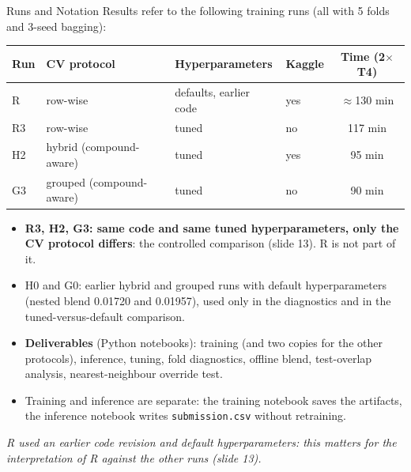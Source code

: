 \documentclass[aspectratio=169,10pt]{beamer}
\newcommand{\smallnote}[1]{{\tiny\textit{#1}}}
\begin{document}
\begin{frame}{Runs and Notation}
\small
Results refer to the following training runs (all with 5 folds and 3-seed bagging):
\vspace{0.3em}

\begin{tabular}{llllc}
\toprule
\textbf{Run} & \textbf{CV protocol} & \textbf{Hyperparameters} & \textbf{Kaggle} & \textbf{Time (2$\times$T4)}\\
\midrule
R  & row-wise & defaults, earlier code & yes & $\approx$130 min\\
R3 & row-wise & tuned & no & 117 min\\
H2 & hybrid (compound-aware) & tuned & yes & 95 min\\
G3 & grouped (compound-aware) & tuned & no & 90 min\\
\bottomrule
\end{tabular}
\vspace{0.5em}
\begin{itemize}
  \item \textbf{R3, H2, G3: same code and same tuned hyperparameters, only the CV protocol differs}: the controlled comparison (slide 13). R is not part of it.
  \item H0 and G0: earlier hybrid and grouped runs with default hyperparameters (nested blend 0.01720 and 0.01957), used only in the diagnostics and in the tuned-versus-default comparison.
  \item \textbf{Deliverables} (Python notebooks): training (and two copies for the other protocols), inference, tuning, fold diagnostics, offline blend, test-overlap analysis, nearest-neighbour override test.
  \item Training and inference are separate: the training notebook saves the artifacts, the inference notebook writes \texttt{submission.csv} without retraining.
\end{itemize}
\smallnote{R used an earlier code revision and default hyperparameters: this matters for the interpretation of R against the other runs (slide 13).}
\end{frame}
\end{document}
